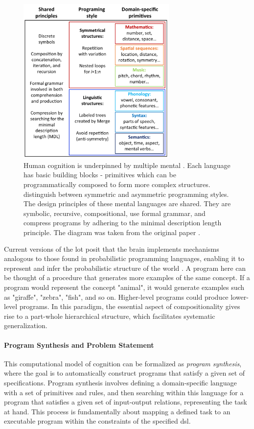 \begin{figure}[H]
    \centering
    \includegraphics[width=0.7\textwidth]{../img/DSL.png}
    \caption{Human cognition is underpinned by multiple mental . Each language has basic building blocks - primitives which can be programmatically composed to form more complex structures. \citet{dehaeneSymbolsMentalPrograms2022} distinguish between symmetric and asymmetric programming styles. The design principles of these mental languages are shared. They are symbolic, recursive, compositional, use formal grammar, and compress programs by adhering to the minimal description length principle. The diagram was taken from the original paper \cite{dehaeneSymbolsMentalPrograms2022}.}
    \label{fig:DSL}
\end{figure}

Current versions of the \acrshort{lot} posit that the brain implements mechanisms analogous to those found in probabilistic programming languages, enabling it to represent and infer the probabilistic structure of the world \cite{lakeBuildingMachinesThat2017,ruleChildHacker2020}. A program here can be thought of a procedure that generates more examples of the same concept. If a program would represent the concept "animal", it would generate examples such as "giraffe", "zebra", "fish", and so on. Higher-level programs could produce lower-level programs. In this paradigm, the essential aspect of compositionality gives rise to a part-whole hierarchical structure, which facilitates systematic generalization.

\paragraph*{Program Synthesis and Problem Statement}
This computational model of cognition can be formalized as \emph{program synthesis}, where the goal is to automatically construct programs that satisfy a given set of specifications.
Program synthesis involves defining a domain-specific language with a set of primitives and rules, and then searching within this language for a program that satisfies a given set of input-output relations, representing the task at hand. This process is fundamentally about mapping a defined task to an executable program within the constraints of the specified \acrshort{dsl}.

